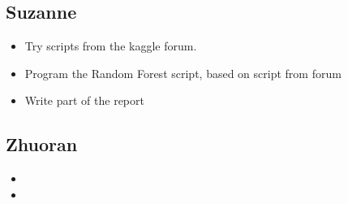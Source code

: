 \documentclass{article}
\begin{document}
\subsection{Suzanne}

\begin{itemize}
\item Try scripts from the kaggle forum.
\item Program the Random Forest script, based on script from forum
\item Write part of the report
\end{itemize}

\subsection{Zhuoran}

\begin{itemize}
\item
\item
\end{itemize}
\end{document}
